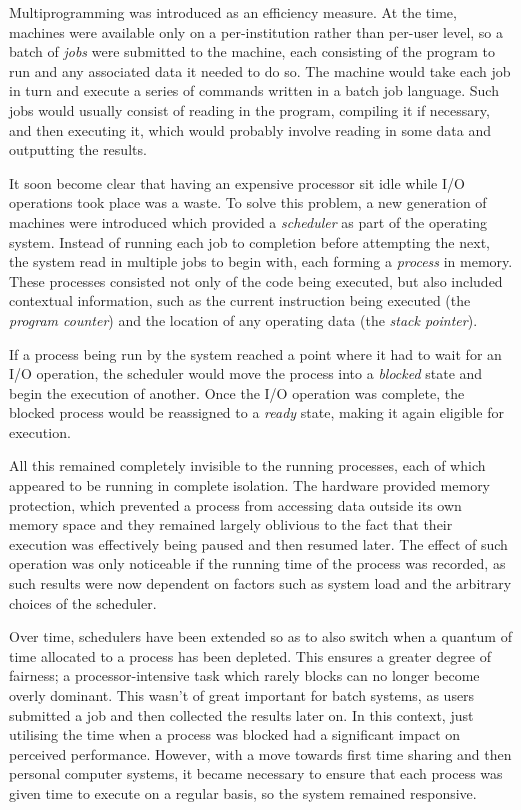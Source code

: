 Multiprogramming was introduced as an efficiency measure.  At the
time, machines were available only on a per-institution rather than
per-user level, so a batch of \emph{jobs} were submitted to the
machine, each consisting of the program to run and any associated data
it needed to do so.  The machine would take each job in turn and
execute a series of commands written in a batch job language.  Such
jobs would usually consist of reading in the program, compiling it if
necessary, and then executing it, which would probably involve reading
in some data and outputting the results.

It soon become clear that having an expensive processor sit idle while
I/O operations took place was a waste.  To solve this problem, a new
generation of machines were introduced which provided a
\emph{scheduler} as part of the operating system.  Instead of running
each job to completion before attempting the next, the system read in
multiple jobs to begin with, each forming a \emph{process} in memory.
These processes consisted not only of the code being executed, but
also included contextual information, such as the current instruction
being executed (the \emph{program counter}) and the location of any
operating data (the \emph{stack pointer}).

If a process being run by the system reached a point where it had to
wait for an I/O operation, the scheduler would move the process into a
\emph{blocked} state and begin the execution of another.  Once the I/O
operation was complete, the blocked process would be reassigned to a
\emph{ready} state, making it again eligible for execution.

All this remained completely invisible to the running processes, each
of which appeared to be running in complete isolation.  The hardware
provided memory protection, which prevented a process from accessing
data outside its own memory space and they remained largely oblivious
to the fact that their execution was effectively being paused and then
resumed later.  The effect of such operation was only noticeable if
the running time of the process was recorded, as such results were now
dependent on factors such as system load and the arbitrary choices of
the scheduler.

Over time, schedulers have been extended so as to also switch when a
quantum of time allocated to a process has been depleted.  This
ensures a greater degree of fairness; a processor-intensive task which
rarely blocks can no longer become overly dominant.  This wasn't of
great important for batch systems, as users submitted a job and then
collected the results later on.  In this context, just utilising the
time when a process was blocked had a significant impact on perceived
performance.  However, with a move towards first time sharing and then
personal computer systems, it became necessary to ensure that each
process was given time to execute on a regular basis, so the system
remained responsive.


